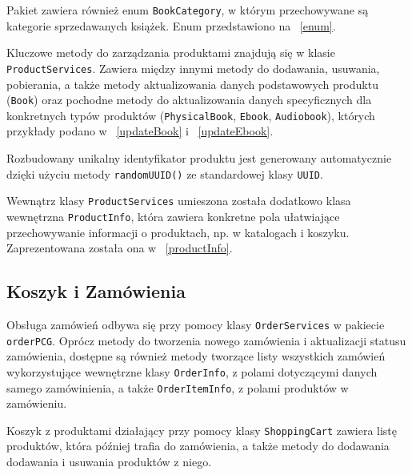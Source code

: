 Pakiet zawiera również enum \texttt{BookCategory}, w którym przechowywane są kategorie sprzedawanych książek. 
Enum przedstawiono na \listingname~\ref{enum}.


Kluczowe metody do zarządzania produktami znajdują się w klasie \texttt{ProductServices}.
Zawiera między innymi metody do dodawania, usuwania, pobierania, a także metody aktualizowania danych podstawowych produktu (\texttt{Book}) oraz pochodne 
metody do aktualizowania danych specyficznych dla konkretnych typów produktów (\texttt{PhysicalBook}, \texttt{Ebook}, \texttt{Audiobook}), których przykłady 
podano w \listingname~\ref{updateBook} i \listingname~\ref{updateEbook}.



Rozbudowany unikalny identyfikator produktu jest generowany automatycznie dzięki użyciu metody \texttt{randomUUID()} ze standardowej klasy \texttt{UUID}.

Wewnątrz klasy \texttt{ProductServices} umieszona została dodatkowo klasa wewnętrzna \texttt{ProductInfo}, która zawiera konkretne pola ułatwiające przechowywanie
informacji o produktach, np. w katalogach i koszyku. Zaprezentowana została ona w \listingname~\ref{productInfo}.



\subsection{Koszyk i Zamówienia}

Obsługa zamówień odbywa się przy pomocy klasy \texttt{OrderServices} w pakiecie \texttt{orderPCG}. Oprócz metody do tworzenia nowego zamówienia i aktualizacji statusu zamówienia, dostępne są również metody 
tworzące listy wszystkich zamówień wykorzystujące wewnętrzne klasy \texttt{OrderInfo}, z polami dotyczącymi danych samego zamówinienia, a także \texttt{OrderItemInfo}, z polami produktów w zamówieniu.

Koszyk z produktami działający przy pomocy klasy \texttt{ShoppingCart} zawiera listę produktów, która później trafia do zamówienia, a także metody do dodawania dodawania i usuwania produktów z niego.

